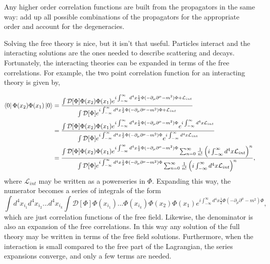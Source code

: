 Any higher order correlation functions are built from the propagators in the same way: add up all possible combinations of the propagators for the appropriate order and account for the degeneracies.  

Solving the free theory is nice, but it isn't that useful. Particles interact and the interacting solutions are the ones needed to describe scattering and decays. Fortunately, the interacting theories can be expanded in terms of the free correlations. For example, the two point correlation function for an interacting theory is given by,

\begin{equation}
\begin{split}
\bra{0}\Phi(x_2)\Phi(x_1)\ket{0} &= 
\frac{\int \mathcal{D}[\Phi]\Phi(x_2)\Phi(x_1)e^{i\int_{-\infty}^{\infty} d^4x \frac{1}{2}\Phi (-\partial_\mu\partial^\mu - m^2)\Phi + \mathcal{L}_{int}}}
{\int \mathcal{D}[\Phi]e^{i\int_{-\infty}^{\infty} d^4x \frac{1}{2}\Phi (-\partial_\mu\partial^\mu - m^2)\Phi + \mathcal{L}_{int}}} \\
&= \frac{\int \mathcal{D}[\Phi]\Phi(x_2)\Phi(x_1)
e^{i\int_{-\infty}^{\infty} d^4x \frac{1}{2}\Phi (-\partial_\mu\partial^\mu - m^2)\Phi} e^{i\int_{-\infty}^{\infty} d^4x \mathcal{L}_{int}}}
{\int \mathcal{D}[\Phi]e^{i\int_{-\infty}^{\infty} d^4x \frac{1}{2}\Phi (-\partial_\mu\partial^\mu - m^2)\Phi}  e^{i\int_{-\infty}^{\infty} d^4x \mathcal{L}_{int}}} \\
&= \frac{\int \mathcal{D}[\Phi]\Phi(x_2)\Phi(x_1)
e^{i\int_{-\infty}^{\infty} d^4x \frac{1}{2}\Phi (-\partial_\mu\partial^\mu - m^2)\Phi} \sum_{n=0}^{\infty} \frac{1}{n!}\left(i\int_{-\infty}^{\infty} d^4x \mathcal{L}_{int}\right)^n}
{\int \mathcal{D}[\Phi]e^{i\int_{-\infty}^{\infty} d^4x \frac{1}{2}\Phi (-\partial_\mu\partial^\mu - m^2)\Phi} \sum_{n=0}^{\infty} \frac{1}{n!}\left(i\int_{-\infty}^{\infty} d^4x \mathcal{L}_{int}\right)^n }, \\
\end{split}
\end{equation}
where $\mathcal{L}_{int}$ may be written as a powerseries in $\Phi$. Expanding this way, the numerator becomes a series of integrals of the form
%
\begin{equation}
\int d^4x_{i_1}d^4x_{i_2} ... d^4x_{i_k} \int \mathcal{D}[\Phi]\Phi(x_{i_1})...\Phi(x_{i_k})\Phi(x_2)\Phi(x_1)e^{i\int_{-\infty}^{\infty} d^4x \frac{1}{2}\Phi (-\partial_\mu\partial^\mu - m^2)\Phi},
\end{equation} 
%
which are just correlation functions of the free field. Likewise, the denominator is also an expansion of the free correlations. In this way any solution of the full theory may be written in terms of the free field solutions. Furthermore, when the interaction is small compared to the free part of the Lagrangian, the series expansions converge, and only a few terms are needed.   

